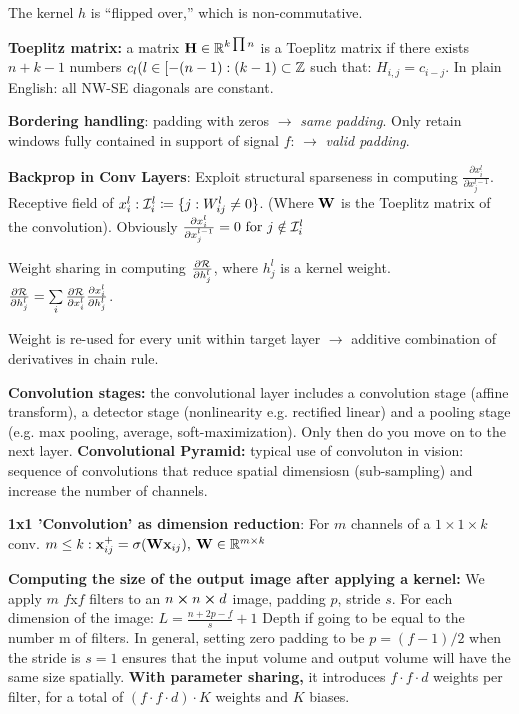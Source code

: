     The kernel $h$ is ``flipped over,'' which is non-commutative.
    
    \textbf{Toeplitz matrix:} a matrix $\mathbf H\in\mathbb R^{k\prod n}$ is a Toeplitz matrix if there exists $n+k-1$ numbers $c_l(l\in[-(n-1):(k-1) \subset \mathbb Z$ such that: $H_{i,j}=c_{i-j}$. In plain English: all NW-SE diagonals are constant.
    
    \textbf{Bordering handling}: padding with zeros $\xrightarrow{}$ \emph{same padding}. Only retain windows fully contained in support of signal $f$: $\xrightarrow{}$ \emph{valid padding}.
    
    \textbf{Backprop in Conv Layers}: Exploit structural sparseness in computing $\frac{\partial x^l_i}{\partial x^{l-1}_j}$. Receptive field of $x^l_i:\mathcal{I}^l_i\coloneqq\{j:W^l_{ij}\neq0\}$. (Where $\mathbf W$ is the Toeplitz matrix of the convolution). Obviously $\frac{\partial x^l_i}{\partial x^{l-1}_j}=0 \text{ for } j\notin\mathcal{I}^l_i$
    
    Weight sharing in computing $\frac{\partial\mathcal{R}}{\partial h^l_j}$, where $h^l_j$ is a kernel weight. \\
    \tab$\frac{\partial\mathcal{R}}{\partial h^l_j}=\sum\limits_i\frac{\partial\mathcal{R}}{\partial x^l_i}\frac{\partial x^l_i}{\partial h^l_j}$.
    
    Weight is re-used for every unit within target layer $\xrightarrow{}$ additive combination of derivatives in chain rule.
    
    \textbf{Convolution stages:} the convolutional layer includes a convolution stage (affine transform), a detector stage (nonlinearity e.g. rectified linear) and a pooling stage (e.g. max pooling, average, soft-maximization). Only then do you move on to the next layer. \textbf{Convolutional Pyramid:} typical use of convoluton in vision: sequence of convolutions that reduce spatial dimensiosn (sub-sampling) and increase the number of channels.
    
    \textbf{1x1 'Convolution' as dimension reduction}: 
    For $m$ channels of a $1\times1\times k$ conv. $m\leq k:\mathbf x^+_{ij}=\sigma(\mathbf W\mathbf x_{ij}),\>\mathbf W\in\mathbb R^{m\times k}$ 
    
    \textbf{Computing the size of the output image after applying a kernel:} We apply $m$ $f$x$f$ filters to an $n \cross n \cross d$ image, padding $p$, stride $s$. For each dimension of the image: $L=\frac{n+2p-f}{s}+1$ Depth if going to be equal to the number m of filters.
    In general, setting zero padding to be $p=(f-1)/2$ when the stride is $s=1$ ensures that the input volume and output volume will have the same size spatially.
   \textbf{ With parameter sharing,} it introduces $f \cdot f \cdot d $ weights per filter, for a total of $(f\cdot f\cdot d)\cdot K$ weights and $K$ biases.
